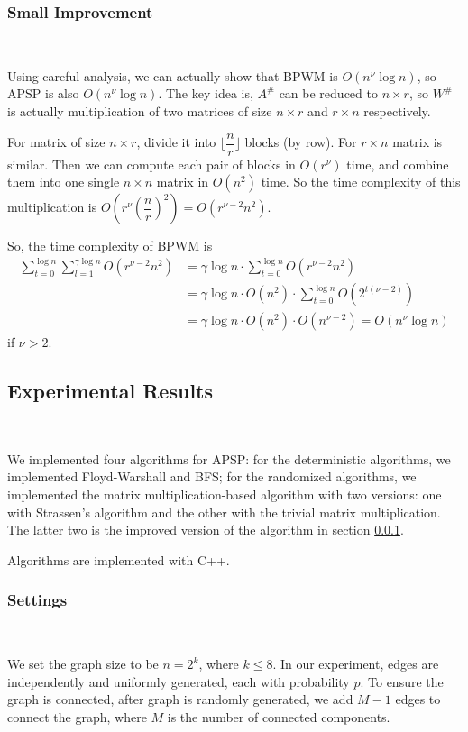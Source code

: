 \documentclass[11pt]{article}
\theoremstyle{plain}
\begin{document}
\subsubsection{Small Improvement}
\label{imp}\

Using careful analysis, we can actually show that BPWM is $O(n^\nu \log n)$, so APSP is also $O(n^\nu \log n)$. The key idea is, $A^\#$ can be reduced to $n\times r$, so $W^\#$ is actually multiplication of two matrices of size $n\times r$ and $r\times n$ respectively.

For matrix of size $n\times r$, divide it into $\lfloor\dfrac{n}{r}\rfloor$ blocks (by row). For $r\times n$ matrix is similar. Then we can compute each pair of blocks in $O(r^{\nu})$ time, and combine them into one single $n\times n$ matrix in $O(n^2)$ time. So the time complexity of this multiplication is $O(r^\nu(\dfrac{n}{r})^2)=O(r^{\nu-2}n^2)$.

So, the time complexity of BPWM is
\begin{align*}
\sum\limits_{t=0}^{\log n}\sum\limits_{l=1}^{\gamma\log n} O(r^{\nu-2}n^2) &= \gamma\log n\cdot \sum\limits_{t=0}^{\log n} O(r^{\nu-2}n^2)\\
&= \gamma\log n\cdot O(n^2)\cdot \sum\limits_{t=0}^{\log n} O(2^{t(\nu-2)})\\
&= \gamma\log n\cdot O(n^2)\cdot O(n^{\nu-2}) = O(n^\nu\log n)
\end{align*}
if $\nu>2$.

\subsection{Experimental Results}\

We implemented four algorithms for APSP: for the deterministic algorithms, we implemented Floyd-Warshall and BFS; for the randomized algorithms, we implemented the matrix multiplication-based algorithm with two versions: one with Strassen's algorithm and the other with the trivial matrix multiplication. The latter two is the improved version of the algorithm in section \ref{imp}.

Algorithms are implemented with C++.

\subsubsection{Settings}\

We set the graph size to be $n=2^k$, where $k\le 8$. In our experiment, edges are independently and uniformly generated, each with probability $p$. To ensure the graph is connected, after graph is randomly generated, we add $M-1$ edges to connect the graph, where $M$ is the number of connected components.
\end{document}
